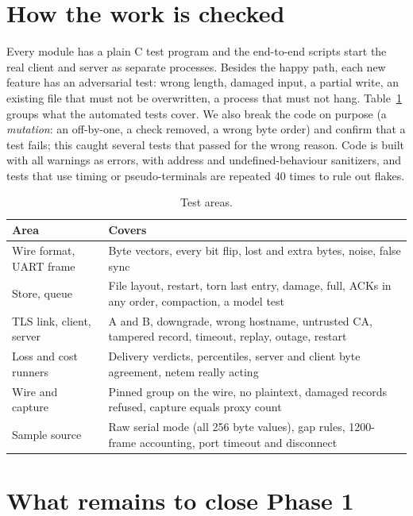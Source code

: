 \documentclass[11pt,a4paper]{article}
\begin{document}
\section{How the work is checked}

Every module has a plain C test program and the end-to-end scripts start the real client and server as
separate processes. Besides the happy path, each new feature has an adversarial test: wrong length, damaged
input, a partial write, an existing file that must not be overwritten, a process that must not hang.
Table~\ref{tab:tests} groups what the \NTests{} automated tests cover. We also break the code on purpose (a
\emph{mutation}: an off-by-one, a check removed, a wrong byte order) and confirm that a test fails; this
caught several tests that passed for the wrong reason. Code is built with all warnings as errors, with
address and undefined-behaviour sanitizers, and tests that use timing or pseudo-terminals are repeated 40
times to rule out flakes.

\begin{table}[!htbp]
\centering
\caption{Test areas.}
\label{tab:tests}
\small
\begin{tabularx}{\linewidth}{@{}lX@{}}
\toprule
Area & Covers \\
\midrule
Wire format, UART frame & Byte vectors, every bit flip, lost and extra bytes, noise, false sync \\
Store, queue & File layout, restart, torn last entry, damage, full, ACKs in any order, compaction, a model test \\
TLS link, client, server & A and B, downgrade, wrong hostname, untrusted CA, tampered record, timeout, replay, outage, restart \\
Loss and cost runners & Delivery verdicts, percentiles, server and client byte agreement, netem really acting \\
Wire and capture & Pinned group on the wire, no plaintext, damaged records refused, capture equals proxy count \\
Sample source & Raw serial mode (all 256 byte values), gap rules, 1200-frame accounting, port timeout and disconnect \\
\bottomrule
\end{tabularx}
\end{table}

\section{What remains to close Phase 1}
\end{document}
